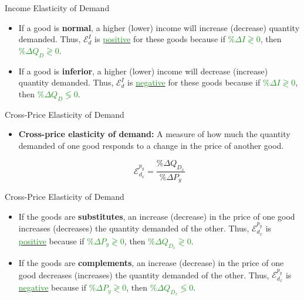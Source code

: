 \documentclass[xcolor={dvipsnames},pdf, hyperref={colorlinks=true, citecolor=ForestGreen, linkcolor=BlueViolet, urlcolor=Magenta}]{beamer}
\newcommand{\defn}[1]{\textbf{#1}}
\newcommand{\dd}[1]{{\underline{\textcolor{ForestGreen}{#1}}}}
\begin{document}
\begin{frame}{Income Elasticity of Demand}

		
		\begin{itemize}
			
			\item	If a good is \defn{normal}, a higher (lower) income will increase (decrease) quantity demanded. Thus,  $\mathcal{E}_d^I$ is \dd{positive} for these goods because if \dd{$\%\Delta I\gtrless  0$}, then \dd{$\%\Delta Q_D\gtrless  0$}. 
			\\
			
			\item	If a good is \defn{inferior},  a higher (lower) income will decrease (increase) quantity demanded. Thus, $\mathcal{E}_d^I$ is \dd{negative} for these goods because if \dd{$\%\Delta I\gtrless  0$}, then \dd{$\%\Delta Q_D\lessgtr  0$}. 
		\end{itemize}
		
		

\end{frame}

\begin{frame}{Cross-Price Elasticity of Demand}
	\begin{itemize}
			\item \defn{Cross-price elasticity of demand:} A measure of how much the quantity demanded of one good responds to a change in the price of another good.
			
			\[\mathcal{E}_{d_x}^{p_y} = \frac{\% \Delta Q_{D_x}}{\% \Delta P_y}\] 
	
\end{itemize}
\end{frame}

\begin{frame}{Cross-Price Elasticity of Demand}

		\begin{itemize}	
			\item	If the goods are \defn{substitutes}, an increase (decrease) in the price of one good increases (decreases) the quantity demanded of the other. Thus, $\mathcal{E}_{d_x}^{p_y}$ is \dd{positive} because if \dd{$\%\Delta P_y \gtrless  0$}, then \dd{$\%\Delta Q_{D_x}\gtrless 0$}. 
			
			\item	If the goods are \defn{complements}, an increase (decrease) in the price of one good decreases (increases) the quantity demanded of the other. Thus, $\mathcal{E}_{d_x}^{p_y}$ is \dd{negative} because if  \dd{$\%\Delta P_y\gtrless  0$}, then \dd{$\%\Delta Q_{D_x} \lessgtr  0$}.
		\end{itemize}

\end{frame}
\end{document}

